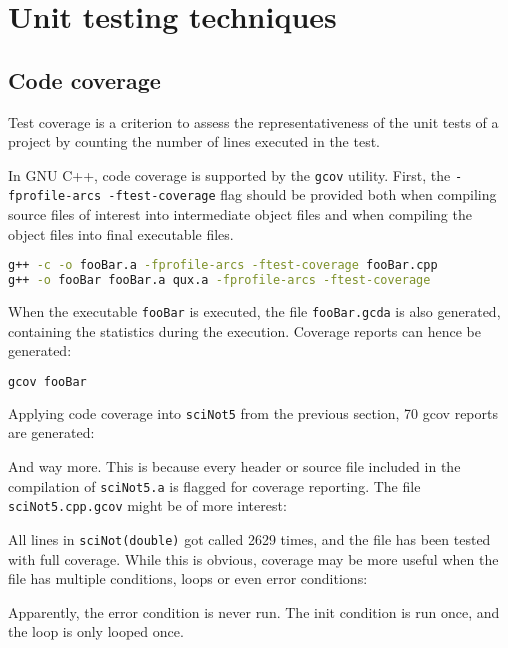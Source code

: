 \section{Unit testing techniques}
\subsection{Code coverage}
Test coverage is a criterion to assess the representativeness of the unit tests of a project by counting the number of lines executed in the test.

In GNU C++, code coverage is supported by the \texttt{gcov} utility.
First, the \texttt{-fprofile-arcs -ftest-coverage} flag should be provided both
when compiling source files of interest into intermediate object files
and when compiling the object files into final executable files.

\begin{lstlisting}[style=Cpp, language=bash]
g++ -c -o fooBar.a -fprofile-arcs -ftest-coverage fooBar.cpp
g++ -o fooBar fooBar.a qux.a -fprofile-arcs -ftest-coverage
\end{lstlisting}

When the executable \texttt{fooBar} is executed, the file \texttt{fooBar.gcda} is also generated,
containing the statistics during the execution. Coverage reports can hence be generated:

\begin{lstlisting}[style=Cpp, language=bash]
gcov fooBar
\end{lstlisting}

Applying code coverage into \texttt{sciNot5} from the previous section, 70 gcov reports are generated:



And way more. This is because every header or source file included in the compilation of \texttt{sciNot5.a}
is flagged for coverage reporting. The file \texttt{sciNot5.cpp.gcov} might be of more interest:


All lines in \texttt{sciNot(double)} got called 2629 times, and the file has been tested with full coverage.
While this is obvious, coverage may be more useful when the file has multiple conditions, loops or even error conditions:


Apparently, the error condition is never run.
The init condition is run once, and the loop is only looped once.

